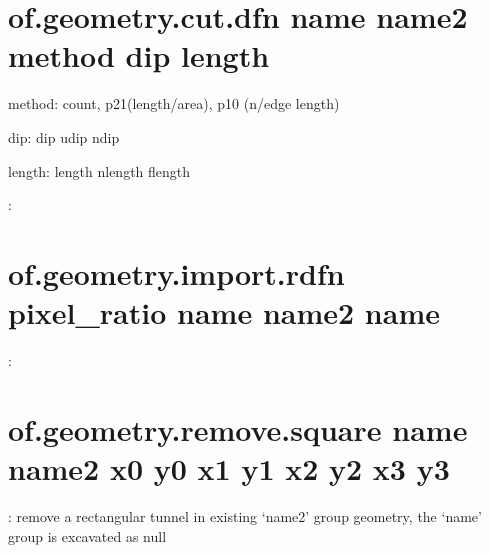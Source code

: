 \documentclass[letterpaper,10pt,english]{sphinxmanual}
\begin{document}
\section{of.geometry.cut.dfn name name2 method dip length}
\label{\detokenize{rst_tutorials/command_line_guide:of-geometry-cut-dfn-name-name2-method-dip-length}}
method: count, p21(length/area), p10 (n/edge length)

dip: dip udip ndip

length: length nlength flength

:

\begin{sphinxVerbatim}[commandchars=\\\{\}]
          
\end{sphinxVerbatim}


\section{of.geometry.import.rdfn pixel\_ratio name name2 name}
\label{\detokenize{rst_tutorials/command_line_guide:of-geometry-import-rdfn-pixel-ratio-name-name2-name}}
:

\begin{sphinxVerbatim}[commandchars=\\\{\}]
    
\end{sphinxVerbatim}


\section{of.geometry.remove.square name name2 x0 y0 x1 y1 x2 y2 x3 y3}
\label{\detokenize{rst_tutorials/command_line_guide:of-geometry-remove-square-name-name2-x0-y0-x1-y1-x2-y2-x3-y3}}
: remove a rectangular tunnel in existing ‘name2’ group geometry,
the ‘name’ group is excavated as null
\end{document}
